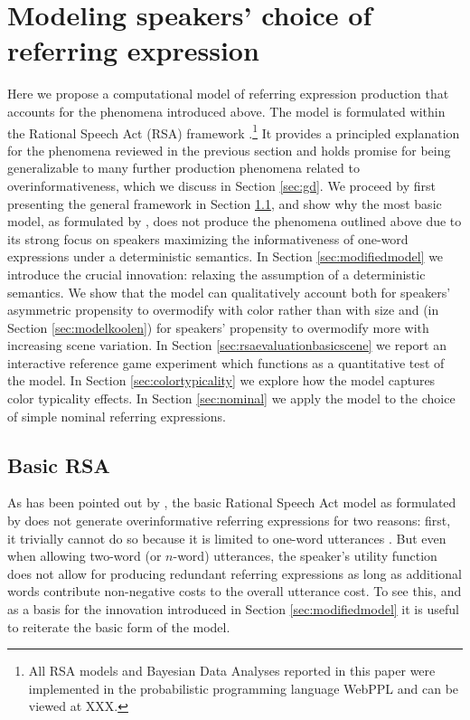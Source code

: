 \documentclass[11pt]{article}
\newcommand{\sectionref}[1]{Section \ref{#1}}
\begin{document}
\section{Modeling speakers' choice of referring expression}
\label{sec:models}

Here we propose a computational model of referring expression production that accounts for the phenomena introduced above. The model is formulated within the Rational Speech Act (RSA) framework \cite{frank2012, goodman2016}.\footnote{All RSA models and Bayesian Data Analyses reported in this paper were implemented in the probabilistic programming language WebPPL \cite{GoodmanStuhlmuller14_DIPPL} and can be viewed at XXX.} It provides a principled explanation for the phenomena reviewed in the previous section and  holds promise for being generalizable to many further production phenomena related to overinformativeness, which we discuss in \sectionref{sec:gd}. We proceed by first presenting the general framework in \sectionref{sec:basicrsa}, and show why the most basic model, as formulated by , does not produce the phenomena outlined above due to its strong focus on speakers maximizing the informativeness of one-word expressions under a deterministic semantics. In \sectionref{sec:modifiedmodel} we introduce the crucial innovation: relaxing the assumption of a deterministic semantics. We show that the model can qualitatively account both for speakers' asymmetric propensity to overmodify with color rather than with size and (in \sectionref{sec:modelkoolen}) for speakers' propensity to overmodify more with increasing scene variation. In \sectionref{sec:rsaevaluationbasicscene} we report an interactive  reference game experiment which functions as a quantitative test of the model. In \sectionref{sec:colortypicality} we explore how the model captures color typicality effects. In \sectionref{sec:nominal} we apply the model to the choice of simple nominal referring expressions. 

\subsection{Basic RSA}
\label{sec:basicrsa}

As has been pointed out by , the basic Rational Speech Act model as formulated by  does not generate overinformative referring expressions for two reasons: first, it trivially cannot do so because it is limited to one-word utterances \cite<see also>{Baumann2014}. But even when allowing two-word (or $n$-word) utterances, the speaker's utility function does not allow for producing redundant referring expressions as long as additional words contribute non-negative costs to the overall utterance cost. To see this, and as a basis for the innovation introduced in \sectionref{sec:modifiedmodel} it is useful to reiterate the basic form of the model.
\end{document}

